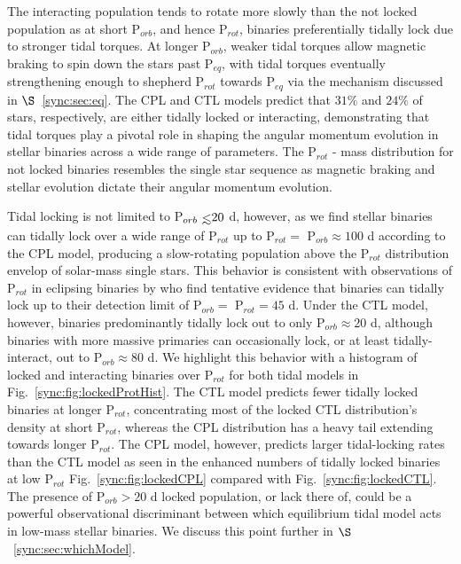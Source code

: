 The interacting population tends to rotate more slowly than the not locked population as at short P$_{orb}$, and hence P$_{rot}$, binaries preferentially tidally lock due to stronger tidal torques.  At longer P$_{orb}$, weaker tidal torques allow magnetic braking to spin down the stars past P$_{eq}$, with tidal torques eventually strengthening enough to shepherd P$_{rot}$ towards P$_{eq}$ via the mechanism discussed in $\S$~\ref{sync:sec:eq}. The CPL and CTL models predict that $31\%$ and $24\%$ of stars, respectively, are either tidally locked or interacting, demonstrating that tidal torques play a pivotal role in shaping the angular momentum evolution in stellar binaries across a wide range of parameters. The P$_{rot}$ - mass distribution for not locked binaries resembles the single star sequence as magnetic braking and stellar evolution dictate their angular momentum evolution.

Tidal locking is not limited to P$_{orb} \lsim 20$ d, however, as we find stellar binaries can tidally lock over a wide range of P$_{rot}$ up to P$_{rot} =$ P$_{orb} \approx 100$ d according to the CPL model, producing a slow-rotating population above the P$_{rot}$ distribution envelop of solar-mass single stars. This behavior is consistent with observations of P$_{rot}$ in \kepler eclipsing binaries by \citet{Lurie2017} who find tentative evidence that binaries can tidally lock up to their detection limit of P$_{orb} = $ P$_{rot} = 45$ d. Under the CTL model, however, binaries predominantly tidally lock out to only P$_{orb} \approx 20$ d, although binaries with more massive primaries can occasionally lock, or at least tidally-interact, out to P$_{orb} \approx 80$ d. We highlight this behavior with a histogram of locked and interacting binaries over P$_{rot}$ for both tidal models in Fig.~\ref{sync:fig:lockedProtHist}. The CTL model predicts fewer tidally locked binaries at longer P$_{rot}$, concentrating most of the locked CTL distribution's density at short P$_{rot}$, whereas the CPL distribution has a heavy tail extending towards longer P$_{rot}$. The CPL model, however, predicts larger tidal-locking rates than the CTL model as seen in the enhanced numbers of tidally locked binaries at low P$_{rot}$ Fig.~\ref{sync:fig:lockedCPL} compared with Fig.~\ref{sync:fig:lockedCTL}. The presence of P$_{orb} > 20$ d locked population, or lack there of, could be a powerful observational discriminant between which equilibrium tidal model acts in low-mass stellar binaries. We discuss this point further in $\S$~\ref{sync:sec:whichModel}. 

